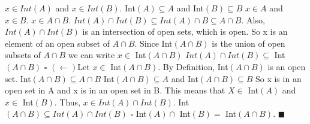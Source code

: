 \documentclass[12pt]{article}
\begin{document}
\(x \in Int(A)\) and \(x \in Int(B)\). \newline
Int\((A) \subseteq A\) and Int\((B) \subseteq B\) \newline
\(x \in A\) and \(x \in B\). \newline
\(x \in A \cap B\). \newline \newline
\(Int(A) \cap Int(B) \subseteq Int(A) \cap B \subseteq A \cap B\).
\newline
Also, \(Int(A) \cap Int(B)\) is an intersection of open sets, which is open. \newline
So x is an element of an open subset of \(A \cap B\). \newline
Since Int\((A \cap B)\) is the union of open subsets of \(A \cap B\) we can write \newline
\(x \in\) Int\((A \cap B)\)
\newline
\(Int(A) \cap Int(B) \subseteq\) Int\((A \cap B)\)
\newline \(\square\) \newline
\((\leftarrow)\)Let \(x \in\) Int\((A \cap B)\).
\newline
By Definition, Int\((A \cap B)\) is an open set. \newline
Int\((A \cap B) \subseteq A \cap B\) \newline
Int\((A \cap B) \subseteq A\) and Int\((A \cap B) \subseteq B\) \newline \newline
So x is in an open set in A and x is in an open set in B. \newline
This means that \(X \in \) Int\((A)\) and \(x \in\) Int\((B)\).
\newline \newline
Thus, \(x \in Int(A) \cap Int(B)\). \newline
Int\((A \cap B) \subseteq Int(A) \cap Int(B)\)
\newline \(\square\) \newline
Int\((A) \cap \) Int\((B) = \) Int\((A \cap B)\).
\newline \(\blacksquare\)
\end{document}
